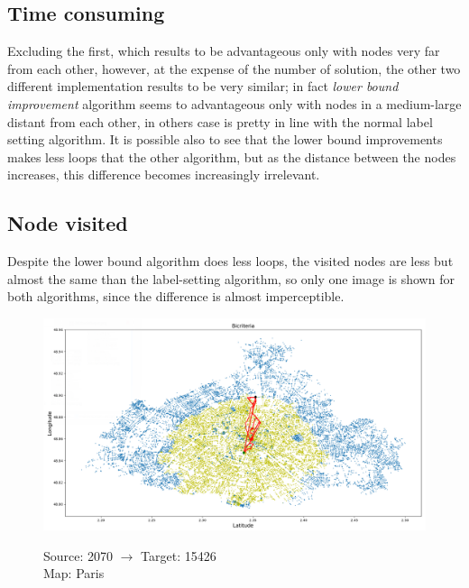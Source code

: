 \documentclass[a4paper,11pt]{report}
\begin{document}
\subsection{Time consuming}
Excluding the first, which results to be advantageous only with nodes very far from each other, however, at the expense of the number of solution, the other two different implementation results to be very similar; in fact \textit{lower bound improvement} algorithm seems to advantageous only with nodes in a medium-large distant from each other, in others case is pretty in line with the normal label setting algorithm. It is possible also to see that the lower bound improvements makes less loops that the other algorithm, but as the distance between the nodes increases, this difference becomes increasingly irrelevant.
\subsection{Node visited}
Despite the lower bound algorithm does less loops, the visited nodes are less but almost the same than the label-setting algorithm, so only one image is shown for both algorithms, since the difference is almost imperceptible.
\begin{figure}[H]
	\centering
	\includegraphics[width=\textwidth]{img/mapOutput/2070->15426Bicriteria.png}
	\label{fig:Bicriteria1}
	\hfill
	\begin{center}
		Source: 2070 $\to$ Target: 15426\\Map: Paris
	\end{center}
\end{figure}
\end{document}

